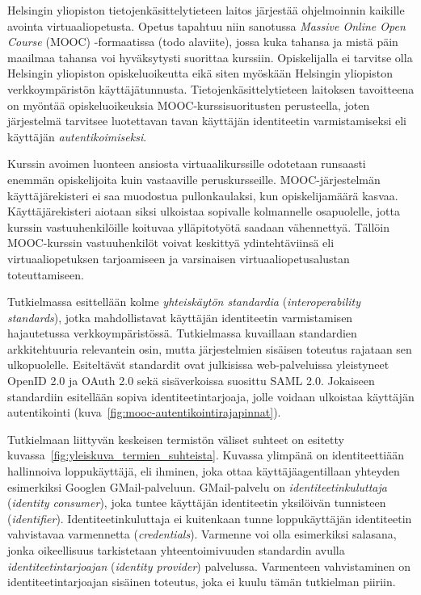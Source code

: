 \documentclass[finnish,gradu]{tktltiki}
\begin{document}
  Helsingin yliopiston tietojenkäsittelytieteen laitos järjestää ohjelmoinnin kaikille avointa virtuaaliopetusta. Opetus tapahtuu niin sanotussa \emph{Massive Online Open Course} (MOOC) -formaatissa (todo alaviite), jossa kuka tahansa ja mistä päin maailmaa tahansa voi hyväksytysti suorittaa kurssiin. Opiskelijalla ei tarvitse olla Helsingin yliopiston opiskeluoikeutta eikä siten myöskään Helsingin yliopiston verkkoympäristön käyttäjätunnusta. Tietojenkäsittelytieteen laitoksen tavoitteena on myöntää opiskeluoikeuksia MOOC-kurssisuoritusten perusteella, joten järjestelmä tarvitsee luotettavan tavan käyttäjän identiteetin varmistamiseksi eli käyttäjän \emph{autentikoimiseksi}.

  Kurssin avoimen luonteen ansiosta virtuaalikurssille odotetaan runsaasti enemmän opiskelijoita kuin vastaaville peruskursseille. MOOC-järjestelmän käyttäjärekisteri ei saa muodostua pullonkaulaksi, kun opiskelijamäärä kasvaa. Käyttäjärekisteri aiotaan siksi ulkoistaa sopivalle kolmannelle osapuolelle, jotta kurssin vastuuhenkilöille koituvaa ylläpitotyötä saadaan vähennettyä. Tällöin MOOC-kurssin vastuuhenkilöt voivat keskittyä ydintehtäviinsä eli virtuaaliopetuksen tarjoamiseen ja varsinaisen virtuaaliopetusalustan toteuttamiseen.

  Tutkielmassa esittellään kolme \emph{yhteiskäytön standardia} (\emph{interoperability standards}), jotka mahdollistavat käyttäjän identiteetin varmistamisen hajautetussa verkkoympäristössä. Tutkielmassa kuvaillaan standardien arkkitehtuuria relevantein osin, mutta järjestelmien sisäisen toteutus rajataan sen ulkopuolelle. Esiteltävät standardit ovat julkisissa web-palveluissa yleistyneet OpenID 2.0 ja OAuth 2.0 sekä sisäverkoissa suosittu SAML 2.0. Jokaiseen standardiin esitellään sopiva identiteetintarjoaja, jolle voidaan ulkoistaa käyttäjän autentikointi (kuva~\ref{fig:mooc-autentikointirajapinnat}).

  Tutkielmaan liittyvän keskeisen termistön väliset suhteet on esitetty kuvassa~\ref{fig:yleiskuva_termien_suhteista}. Kuvassa ylimpänä on identiteettiään hallinnoiva loppukäyttäjä, eli ihminen, joka ottaa käyttäjäagentillaan yhteyden esimerkiksi Googlen GMail-palveluun. GMail-palvelu on \emph{identiteetinkuluttaja} (\emph{identity consumer}), joka tuntee käyttäjän identiteetin yksilöivän tunnisteen (\emph{identifier}). Identiteetinkuluttaja ei kuitenkaan tunne loppukäyttäjän identiteetin vahvistavaa varmennetta (\emph{credentials}). Varmenne voi olla esimerkiksi salasana, jonka oikeellisuus tarkistetaan yhteentoimivuuden standardin avulla \emph{identiteetintarjoajan} (\emph{identity provider}) palvelussa. Varmenteen vahvistaminen on identiteetintarjoajan sisäinen toteutus, joka ei kuulu tämän tutkielman piiriin.
\end{document}
